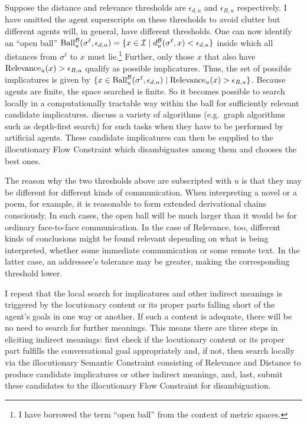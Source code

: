 Suppose the distance and relevance thresholds are $\epsilon_{d,u}$ and $\epsilon_{R,u}$ respectively. I have omitted the agent superscripts on these thresholds to avoid clutter but different agents will, in general, have different thresholds. One can now identify an ``open ball'' $\hbox{Ball}^{\cal B}_u(\sigma^{\ell}, \epsilon_{d,u}) = \{ x \in {\cal I} \mid d^{\cal B}_u(\sigma^{\ell}, x) < \epsilon_{d,u} \}$ inside which all distances from $\sigma^{\ell}$ to $x$ must lie.\footnote{I have borrowed the term ``open ball'' from the context of metric spaces.} Further, only those $x$ that also have $\hbox{Relevance}_u(x) > \epsilon_{R,u}$ qualify as possible implicatures. Thus, the set of possible implicatures is given by $\{ x \in \hbox{Ball}^{\cal B}_u(\sigma^{\ell}, \epsilon_{d,u}) \mid  \hbox{Relevance}_u(x) > \epsilon_{R,u} \}$. Because agents are finite, the space searched is finite. So it becomes possible to search locally in a computationally tractable way within the ball for sufficiently relevant candidate implicatures. \citet[Section~1.3]{jm:slp2} discuss a variety of algorithms (e.g.\ graph algorithms such as depth-first search) for such tasks when they have to be performed by artificial agents. These candidate implicatures can then be supplied to the illocutionary Flow Constraint which disambiguates among them and chooses the best ones.

The reason why the two thresholds above are subscripted with $u$ is that they may be different for different kinds of communication. When interpreting a novel or a poem, for example, it is reasonable to form extended derivational chains consciously. In such cases, the open ball will be much larger than it would be for ordinary face-to-face communication. In the case of Relevance, too, different kinds of conclusions might be found relevant depending on what is being interpreted, whether some immediate communication or some remote text. In the latter case, an addressee's tolerance may be greater, making the corresponding threshold lower.

I repeat that the local search for implicatures and other indirect meanings is triggered by the locutionary content or its proper parts falling short of the agent's goals in one way or another. If such a content is adequate, there will be no need to search for further meanings. This means there are three steps in eliciting indirect meanings: first check if the locutionary content or its proper part fulfills the conversational goal appropriately and, if not, then search locally via the illocutionary Semantic Constraint consisting of Relevance and Distance to produce candidate implicatures or other indirect meanings, and, last, submit these candidates to the illocutionary Flow Constraint for disambiguation.

